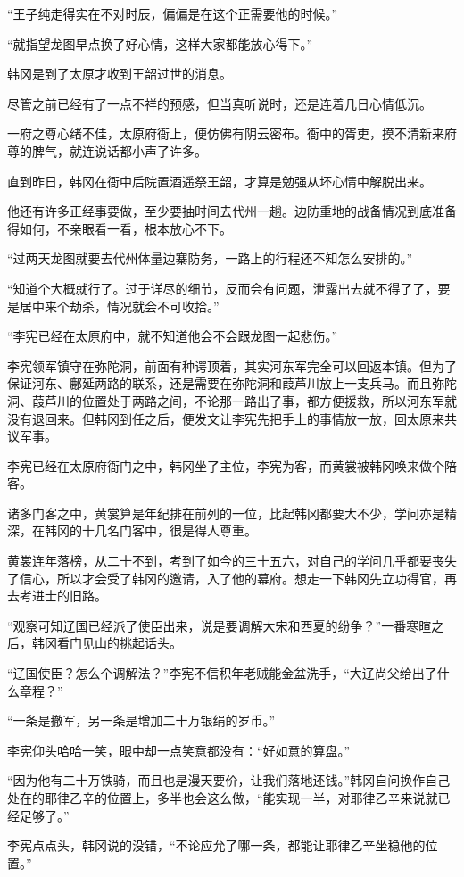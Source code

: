 “王子纯走得实在不对时辰，偏偏是在这个正需要他的时候。”

“就指望龙图早点换了好心情，这样大家都能放心得下。”

韩冈是到了太原才收到王韶过世的消息。

尽管之前已经有了一点不祥的预感，但当真听说时，还是连着几日心情低沉。

一府之尊心绪不佳，太原府衙上，便仿佛有阴云密布。衙中的胥吏，摸不清新来府尊的脾气，就连说话都小声了许多。

直到昨日，韩冈在衙中后院置酒遥祭王韶，才算是勉强从坏心情中解脱出来。

他还有许多正经事要做，至少要抽时间去代州一趟。边防重地的战备情况到底准备得如何，不亲眼看一看，根本放心不下。

“过两天龙图就要去代州体量边寨防务，一路上的行程还不知怎么安排的。”

“知道个大概就行了。过于详尽的细节，反而会有问题，泄露出去就不得了了，要是居中来个劫杀，情况就会不可收拾。”

“李宪已经在太原府中，就不知道他会不会跟龙图一起悲伤。”

李宪领军镇守在弥陀洞，前面有种谔顶着，其实河东军完全可以回返本镇。但为了保证河东、鄜延两路的联系，还是需要在弥陀洞和葭芦川放上一支兵马。而且弥陀洞、葭芦川的位置处于两路之间，不论那一路出了事，都方便援救，所以河东军就没有退回来。但韩冈到任之后，便发文让李宪先把手上的事情放一放，回太原来共议军事。

李宪已经在太原府衙门之中，韩冈坐了主位，李宪为客，而黄裳被韩冈唤来做个陪客。

诸多门客之中，黄裳算是年纪排在前列的一位，比起韩冈都要大不少，学问亦是精深，在韩冈的十几名门客中，很是得人尊重。

黄裳连年落榜，从二十不到，考到了如今的三十五六，对自己的学问几乎都要丧失了信心，所以才会受了韩冈的邀请，入了他的幕府。想走一下韩冈先立功得官，再去考进士的旧路。

“观察可知辽国已经派了使臣出来，说是要调解大宋和西夏的纷争？”一番寒暄之后，韩冈看门见山的挑起话头。

“辽国使臣？怎么个调解法？”李宪不信积年老贼能金盆洗手，“大辽尚父给出了什么章程？”

“一条是撤军，另一条是增加二十万银绢的岁币。”

李宪仰头哈哈一笑，眼中却一点笑意都没有：“好如意的算盘。”

“因为他有二十万铁骑，而且也是漫天要价，让我们落地还钱。”韩冈自问换作自己处在的耶律乙辛的位置上，多半也会这么做，“能实现一半，对耶律乙辛来说就已经足够了。”

李宪点点头，韩冈说的没错，“不论应允了哪一条，都能让耶律乙辛坐稳他的位置。”

